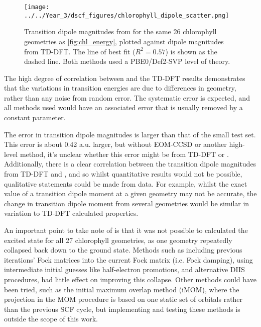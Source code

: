 \begin{figure}
\centering
\texttt{[image: ../../Year\_3/dscf\_figures/chlorophyll\_dipole\_scatter.png]}
\caption{Transition dipole magnitudes from \dscf for the same 26 chlorophyll geometries as
\ref{fig:chl_energy}, plotted against dipole magnitudes from TD-DFT. The line of
best fit ($R^2= 0.57$) is shown as the dashed line. Both methods used a PBE0/Def2-SVP
level of theory.}
\label{fig:chl_dipole}
\end{figure}

The high degree of correlation between \dscf and the TD-DFT results demonstrates
that the variations in transition energies are due to differences in geometry, rather
than any noise from random error. The systematic error is expected, and all methods
used would have an associated error that is usually removed by a constant parameter.

The error in transition dipole magnitudes is larger than that of the small
test set. This error is about 0.42 a.u. larger, but without EOM-CCSD or another
high-level method, it's unclear whether this error might be from TD-DFT or \dscf.
Additionally, there is a clear correlation between the transition dipole magnitudes
from TD-DFT and \dscf, and so whilst quantitative results would not be possible, 
qualitative statements could be made from \dscf data. For example, whilst the exact 
value of a transition dipole moment at a given geometry may not be accurate, the
change in transition dipole moment from several geometries would be similar in
variation to TD-DFT calculated properties.

An important point to take note of is that it was not possible to calculated the 
excited state for all 27 chlorophyll geometries, as one geometry repeatedly collapsed back
down to the ground state. Methods such as including previous iterations' Fock matrices
into the current Fock matrix (i.e. Fock damping), using intermediate initial guesses like 
half-electron promotions, and alternative DIIS procedures, had little effect on 
improving this collapse. Other methods could have been tried, such as the initial
maximum overlap method (iMOM), where the projection in the MOM procedure is based 
on one static set of orbitals rather than the previous SCF cycle, but implementing
and testing these methods is outside the scope of this work.

\afterpartskip
